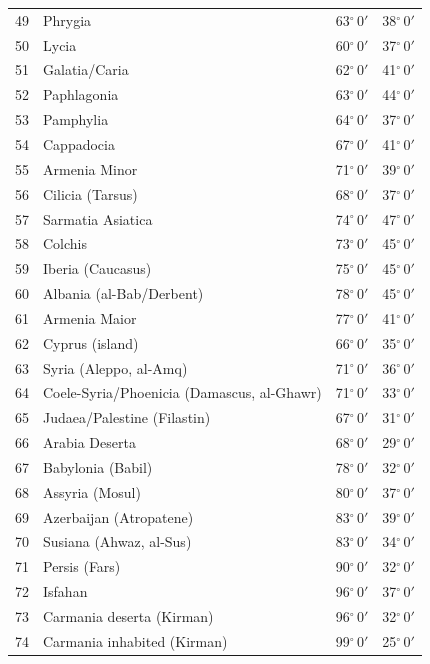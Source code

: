 \documentclass[10pt,a4paper]{article}
\begin{document}
\begin{longtable}{r >{\raggedright\arraybackslash}p{8.5cm} c c}
49 & Phrygia & 63$^\circ$\,0$'$ & 38$^\circ$\,0$'$\\
50 & Lycia & 60$^\circ$\,0$'$ & 37$^\circ$\,0$'$\\
51 & Galatia/Caria & 62$^\circ$\,0$'$ & 41$^\circ$\,0$'$\\
52 & Paphlagonia & 63$^\circ$\,0$'$ & 44$^\circ$\,0$'$\\
53 & Pamphylia & 64$^\circ$\,0$'$ & 37$^\circ$\,0$'$\\
54 & Cappadocia & 67$^\circ$\,0$'$ & 41$^\circ$\,0$'$\\
55 & Armenia Minor & 71$^\circ$\,0$'$ & 39$^\circ$\,0$'$\\
56 & Cilicia (Tarsus) & 68$^\circ$\,0$'$ & 37$^\circ$\,0$'$\\
57 & Sarmatia Asiatica & 74$^\circ$\,0$'$ & 47$^\circ$\,0$'$\\
58 & Colchis & 73$^\circ$\,0$'$ & 45$^\circ$\,0$'$\\
59 & Iberia (Caucasus) & 75$^\circ$\,0$'$ & 45$^\circ$\,0$'$\\
60 & Albania (al-Bab/Derbent) & 78$^\circ$\,0$'$ & 45$^\circ$\,0$'$\\
61 & Armenia Maior & 77$^\circ$\,0$'$ & 41$^\circ$\,0$'$\\
62 & Cyprus (island) & 66$^\circ$\,0$'$ & 35$^\circ$\,0$'$\\
63 & Syria (Aleppo, al-Amq) & 71$^\circ$\,0$'$ & 36$^\circ$\,0$'$\\
64 & Coele-Syria/Phoenicia (Damascus, al-Ghawr) & 71$^\circ$\,0$'$ & 33$^\circ$\,0$'$\\
65 & Judaea/Palestine (Filastin) & 67$^\circ$\,0$'$ & 31$^\circ$\,0$'$\\
66 & Arabia Deserta & 68$^\circ$\,0$'$ & 29$^\circ$\,0$'$\\
67 & Babylonia (Babil) & 78$^\circ$\,0$'$ & 32$^\circ$\,0$'$\\
68 & Assyria (Mosul) & 80$^\circ$\,0$'$ & 37$^\circ$\,0$'$\\
69 & Azerbaijan (Atropatene) & 83$^\circ$\,0$'$ & 39$^\circ$\,0$'$\\
70 & Susiana (Ahwaz, al-Sus) & 83$^\circ$\,0$'$ & 34$^\circ$\,0$'$\\
71 & Persis (Fars) & 90$^\circ$\,0$'$ & 32$^\circ$\,0$'$\\
72 & Isfahan & 96$^\circ$\,0$'$ & 37$^\circ$\,0$'$\\
73 & Carmania deserta (Kirman) & 96$^\circ$\,0$'$ & 32$^\circ$\,0$'$\\
74 & Carmania inhabited (Kirman) & 99$^\circ$\,0$'$ & 25$^\circ$\,0$'$\\

\end{longtable}
\end{document}
